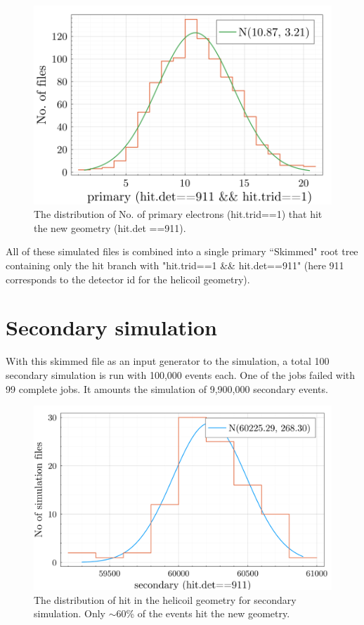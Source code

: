 \documentclass[a4paper,12pt]{article}
\begin{document}
\begin{figure}[h!]
    \centering
    \includegraphics[width=1\linewidth]{image/helicoil-20221121-113016-img-primary-trid-hit-count-hist.png} \caption{The distribution of No. of primary electrons (hit.trid==1) that hit the new geometry (hit.det ==911).}
    \label{fig:primary-dist}
\end{figure}

All of these simulated files is combined into a single primary ``Skimmed" root tree containing only the hit branch with "hit.trid==1 \&\& hit.det==911" (here 911 corresponds to the detector id for the helicoil geometry).

\section{Secondary simulation} \label{sec:secondary-simulation}
With this skimmed file as an input generator to the simulation, a total 100 secondary simulation is run with 100,000 events each. One of the jobs failed with 99 complete jobs. It amounts the simulation of 9,900,000 secondary events.
\begin{figure}[h!]
    \centering
    \includegraphics[width=1\linewidth]{image/helicoil-20221121-113016-img-secondary-det-hit-count-hist-not-normalized.png}
    \caption{The distribution of hit in the helicoil geometry for secondary simulation. Only $\sim 60$\% of the events hit the new geometry.}
    \label{fig:sec-hit-det-distrib}
\end{figure}
\end{document}

